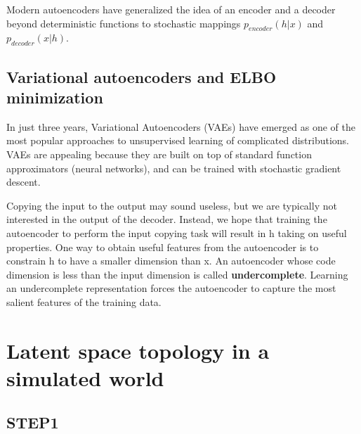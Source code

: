 
Modern autoencoders have generalized the idea of an encoder and a decoder beyond deterministic functions to stochastic mappings $p_{encoder}(h | x)$ and $p_{decoder}(x | h)$.


\subsection{Variational autoencoders and ELBO minimization}

In just three years, Variational Autoencoders (VAEs) have emerged as one of the most popular approaches to unsupervised learning of complicated distributions. VAEs are appealing because they are built on top of standard function approximators (neural networks), and can be trained with stochastic gradient descent.

Copying the input to the output may sound useless, but we are typically not interested in the output of the decoder. Instead, we hope that training the autoencoder to perform the input copying task will result in h taking on useful properties. One way to obtain useful features from the autoencoder is to constrain h to have a smaller dimension than x. An autoencoder whose code dimension is less than the input dimension is called \textbf{undercomplete}. Learning an undercomplete representation forces the autoencoder to capture the most salient features of the training data.







%


\section{Latent space topology in a simulated world}

\subsection{STEP1}

